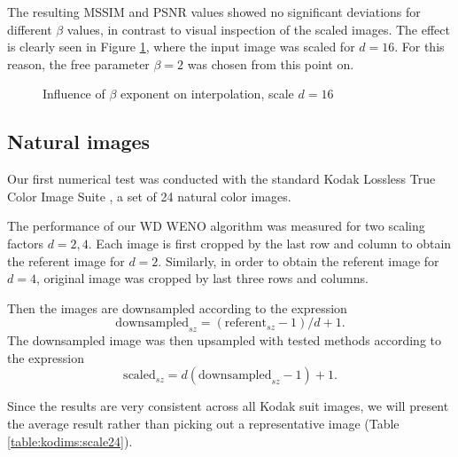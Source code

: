 The resulting MSSIM and PSNR values showed no significant deviations for different $\beta$ values, in contrast to visual inspection of the scaled images.
The effect is clearly seen in Figure \ref{fig:smiley:beta}, where the input image was scaled for $d=16$.
For this reason, the free parameter $\beta=2$ was chosen from this point on.
\begin{figure}
	\begin{center}
		 \quad 
		 \quad 
		 \quad
		 \quad
		 \quad
		 \quad
		\caption{Influence of $\beta$ exponent on interpolation, scale $d=16$}
		\label{fig:smiley:beta}
	\end{center}
\end{figure}	
	
	\subsection{Natural images}\label{sec:natural}
	Our first numerical test was conducted with the standard Kodak  Lossless True Color Image Suite \cite{Kodak}, a set of 24 natural color images.  
	
	The performance of our {WD} WENO algorithm was measured for two scaling factors $d=2, 4$.
	Each image is first cropped by the last row and column to obtain the referent image for $d=2$. 
	Similarly, in order to obtain 
	the referent image for $d=4$, original image was cropped by last three rows and columns.

	Then the images are downsampled according to the expression
	$$\mathrm{downsampled}_{sz} = (\mathrm{referent}_{sz}- 1)/d+1. $$
	The downsampled image was then upsampled with tested methods according to the expression 
	$$\mathrm{scaled}_{sz} = d(\mathrm{downsampled}_{sz} - 1)+1.$$
	
	Since the results are very consistent across all Kodak suit images, we will present the average result rather than picking out a representative image (Table \ref{table:kodims:scale24}).
	
